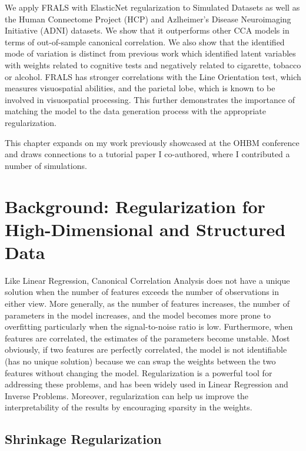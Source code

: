 We apply FRALS with ElasticNet regularization to Simulated Datasets as well as the Human Connectome Project (HCP) and Azlheimer's Disease Neuroimaging Initiative (ADNI) datasets.
We show that it outperforms other CCA models in terms of out-of-sample canonical correlation.
We also show that the identified mode of variation is distinct from previous work which identified latent variables with \gls{weights} related to cognitive tests and negatively related to cigarette, tobacco or alcohol\citep{smith2015positive}.
FRALS has stronger correlations with the Line Orientation test, which measures visuospatial abilities, and the parietal lobe, which is known to be involved in visuospatial processing.
This further demonstrates the importance of matching the model to the data generation process with the appropriate regularization.

This chapter expands on my work previously showcased at the OHBM conference and draws connections to a tutorial paper I co-authored, where I contributed a number of simulations\citep{mihalik2022canonical}.

\section{Background: Regularization for High-Dimensional and Structured Data}\label{sec:background}

Like Linear Regression, Canonical Correlation Analysis does not have a unique solution when the number of features exceeds the number of observations in either view.
More generally, as the number of features increases, the number of parameters in the model increases, and the model becomes more prone to overfitting particularly when the signal-to-noise ratio is low.
Furthermore, when features are correlated, the estimates of the parameters become unstable.
Most obviously, if two features are perfectly correlated, the model is not identifiable (has no unique solution) because we can swap the \gls{weights} between the two features without changing the model.
Regularization is a powerful tool for addressing these problems, and has been widely used in Linear Regression and Inverse Problems.
Moreover, regularization can help us improve the interpretability of the results by encouraging sparsity in the weights.

\subsection{Shrinkage Regularization}

